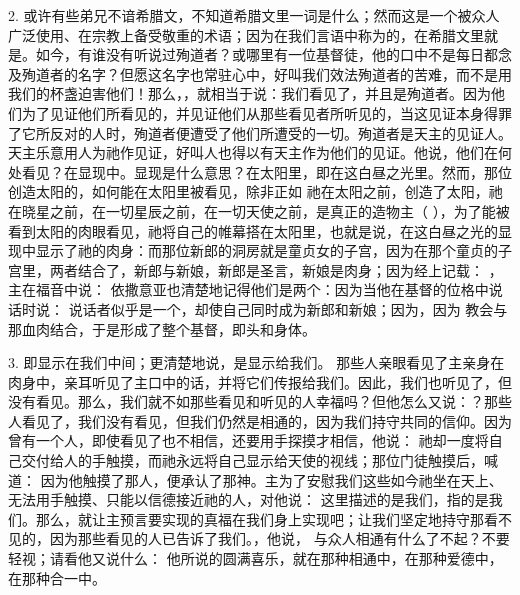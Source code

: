 2.   或许有些弟兄不谙希腊文，不知道希腊文里一词是什么；然而这是一个被众人广泛使用、在宗教上备受敬重的术语；因为在我们言语中称为的，在希腊文里就是。如今，有谁没有听说过殉道者？或哪里有一位基督徒，他的口中不是每日都念及殉道者的名字？但愿这名字也常驻心中，好叫我们效法殉道者的苦难，而不是用我们的杯盏迫害他们！那么，，就相当于说：我们看见了，并且是殉道者。因为他们为了见证他们所看见的，并见证他们从那些看见者所听见的，当这见证本身得罪了它所反对的人时，殉道者便遭受了他们所遭受的一切。殉道者是天主的见证人。天主乐意用人为祂作见证，好叫人也得以有天主作为他们的见证。他说，他们在何处看见？在显现中。显现是什么意思？在太阳里，即在这白昼之光里。然而，那位创造太阳的，如何能在太阳里被看见，除非正如  祂在太阳之前，创造了太阳，祂在晓星之前，在一切星辰之前，在一切天使之前，是真正的造物主（ ），为了能被看到太阳的肉眼看见，祂将自己的帷幕搭在太阳里，也就是说，在这白昼之光的显现中显示了祂的肉身：而那位新郎的洞房就是童贞女的子宫，因为在那个童贞的子宫里，两者结合了，新郎与新娘，新郎是圣言，新娘是肉身；因为经上记载： ，主在福音中说：  依撒意亚也清楚地记得他们是两个：因为当他在基督的位格中说话时说：  说话者似乎是一个，却使自己同时成为新郎和新娘；因为，因为  教会与那血肉结合，于是形成了整个基督，即头和身体。\par

3. 即显示在我们中间；更清楚地说，是显示给我们。  那些人亲眼看见了主亲身在肉身中，亲耳听见了主口中的话，并将它们传报给我们。因此，我们也听见了，但没有看见。那么，我们就不如那些看见和听见的人幸福吗？但他怎么又说：？那些人看见了，我们没有看见，但我们仍然是相通的，因为我们持守共同的信仰。因为曾有一个人，即使看见了也不相信，还要用手探摸才相信，他说：  祂却一度将自己交付给人的手触摸，而祂永远将自己显示给天使的视线；那位门徒触摸后，喊道：  因为他触摸了那人，便承认了那神。主为了安慰我们这些如今祂坐在天上、无法用手触摸、只能以信德接近祂的人，对他说：  这里描述的是我们，指的是我们。那么，就让主预言要实现的真福在我们身上实现吧；让我们坚定地持守那看不见的，因为那些看见的人已告诉了我们。，他说， 与众人相通有什么了不起？不要轻视；请看他又说什么：  他所说的圆满喜乐，就在那种相通中，在那种爱德中，在那种合一中。\par

